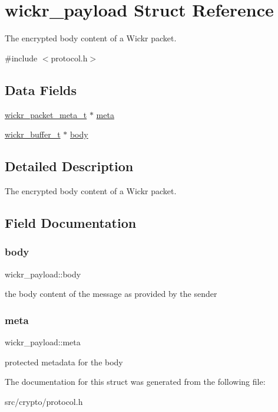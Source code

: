 \hypertarget{structwickr__payload}{}\section{wickr\+\_\+payload Struct Reference}
\label{structwickr__payload}


The encrypted body content of a Wickr packet.  




{\ttfamily \#include $<$protocol.\+h$>$}

\subsection*{Data Fields}
\begin{DoxyCompactItemize}
\item 
\hyperlink{structwickr__packet__meta}{wickr\+\_\+packet\+\_\+meta\+\_\+t} $\ast$ \hyperlink{structwickr__payload_a7df63984a660a0c09c166d60b213213f}{meta}
\item 
\hyperlink{structwickr__buffer}{wickr\+\_\+buffer\+\_\+t} $\ast$ \hyperlink{structwickr__payload_a6ef1b92ffd07c37b86202b4cc88a0522}{body}
\end{DoxyCompactItemize}


\subsection{Detailed Description}
The encrypted body content of a Wickr packet. 

\subsection{Field Documentation}
\mbox{\label{structwickr__payload_a6ef1b92ffd07c37b86202b4cc88a0522}} 
\subsubsection{\texorpdfstring{body}{body}}
{\footnotesize\ttfamily wickr\+\_\+payload\+::body}

the body content of the message as provided by the sender \mbox{\label{structwickr__payload_a7df63984a660a0c09c166d60b213213f}} 
\subsubsection{\texorpdfstring{meta}{meta}}
{\footnotesize\ttfamily wickr\+\_\+payload\+::meta}

protected metadata for the body 

The documentation for this struct was generated from the following file\+:\begin{DoxyCompactItemize}
\item 
src/crypto/protocol.\+h\end{DoxyCompactItemize}
